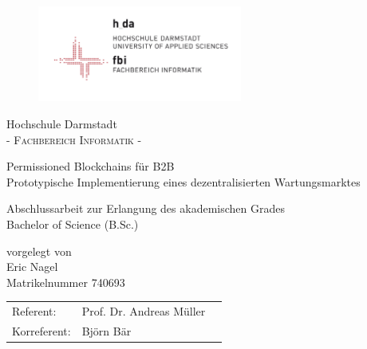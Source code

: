 \pagestyle{empty} %

\begin{figure}[t]
	\centering
	\includegraphics[width=0.6\textwidth]{images/logo_fbi}
\end{figure}


\begin{center}
\Large Hochschule Darmstadt \\
\normalsize \textsc{- Fachbereich Informatik -} \\

\vspace{80 pt}

\Huge Permissioned Blockchains für B2B \\ 
\Large Prototypische Implementierung eines dezentralisierten Wartungsmarktes \\
\normalsize
\vspace{20 pt}

Abschlussarbeit zur Erlangung des akademischen Grades \\ 
Bachelor of Science (B.Sc.) 

\vspace{75 pt}


vorgelegt von \\
\vspace{5 pt}
Eric Nagel \\
Matrikelnummer 740693
\vspace{80 pt}

\begin{tabular}[h]{p{4cm}l l}
	Referent: & Prof. Dr. Andreas Müller \\
	Korreferent: & Björn Bär
\end{tabular}


\end{center}
